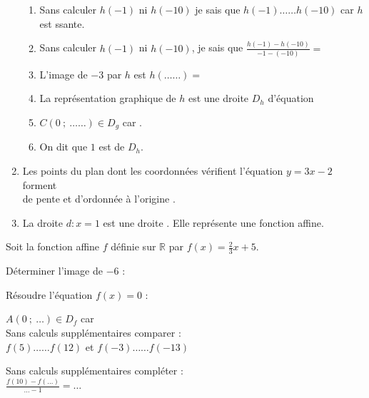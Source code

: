 \documentclass[main.tex]{subfiles}
\begin{document}
\begin{exercise}
\begin{spacing}{2.0}
\begin{enumerate}[label={\arabic*)}, leftmargin=*]
\begin{enumerate}[label={}, leftmargin=*]
		\item Sans calculer $h(-1)$ ni $h(-10)$ je sais que $h(-1)\ldots\ldots h(-10)$ car $h$ est \dotfill ssante.
		\item Sans calculer $h(-1)$ ni $h(-10)$, je sais que $\frac{h(-1)-h(-10)}{-1-(-10)}=$\dotfill 
		\item L'image de $-3$ par $h$ est $h(\ldots\ldots)=$\dotfill 
		\item La représentation graphique de $h$ est une droite $D_h$ \dotfill d'équation \dotfill 
		\item $C(0 ~;~\ldots\ldots)\in D_g$ car \dotfill.
		\item On dit que $1$ est \dotfill  de $D_h$. 
	\end{enumerate}
\item Les points du plan dont les coordonnées vérifient l'équation $y=3x-2$ forment \dotfill \\
\null  \dotfill de pente \dotfill et d'ordonnée à l'origine \dotfill.
\item La droite $d\colon x=1$ est une droite \dotfill\dotfill. Elle \dotfill représente \dotfill une fonction affine.
\end{enumerate}
\end{spacing}
\end{exercise}\vspace{-2em}  
\begin{exercise}Soit la fonction affine $f$ définie sur $\mathbb{R}$ par $f(x)=\frac{2}{3}x+5$.\\
\noindent
\parbox{0.27\linewidth}{
Déterminer l'image de $-6$ :\\

\vspace{7.5em}
}
\hfill 
\parbox{0.3\linewidth}{
Résoudre l'équation $f(x)=0$ : \\ 

\vspace{7.5em}
}
\hfill 
\parbox{0.4\linewidth}{ 
\bigskip $A(0~;~\ldots)\in D_f$ car \dotfill \bigskip\\
\bigskip Sans calculs supplémentaires comparer :\\
$f(5)\ldots\ldots f(12)$ et $f(-3)\ldots\ldots f(-13)$

\bigskip  Sans calculs supplémentaires compléter :\\
$\frac{f(10)-f(\ldots)}{\ldots-1}=\ldots$ 
}  
\end{exercise}
\end{document}
